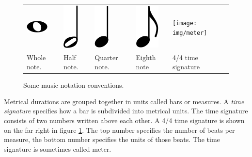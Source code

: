 \begin{figure}
\centering
\begin{tabular}{lllll}
\parbox{0.1\linewidth}{
\centering
\includegraphics[scale=0.3]{img/whole_note}
}
&
\parbox{0.1\linewidth}{
\centering
\includegraphics[scale=0.3]{img/half_note}
}
&
\parbox{0.1\linewidth}{
\centering
\includegraphics[scale=0.3]{img/quarter_note}
}
&
\parbox{0.1\linewidth}{
\centering
\includegraphics[scale=0.3]{img/eighth_note}
}
&
\parbox{0.1\linewidth}{
\centering
\texttt{[image: img/meter]}
}
\\
Whole note. & Half note. & Quarter note. & Eighth note & 4/4 time signature\\

\end{tabular}
\caption{Some music notation conventions.}
\label{fig:notation}
\end{figure}

Metrical durations are grouped together in units called bars or measures. A \textit{time signature} specifies how a bar is subdivided into metrical units. The time signature consists of two numbers written above each other. A 4/4 time signature is shown on the far right in figure \ref{fig:notation}. The top number specifies the number of beats per measure, the bottom number specifies the units of those beats. The time signature is sometimes called meter.

